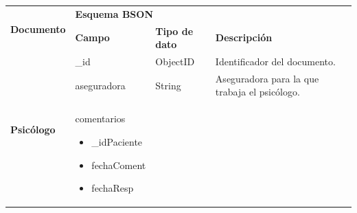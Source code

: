 \begin{table}[htpb]
\centering
\begin{tabularx}{\textwidth}{|l|X|X|X|X|}
\hline
\multirow{2}{*}{\textbf{Documento}}  & \multicolumn{3}{l|}{\textbf{Esquema BSON}}                                                                                                                                                                                                                                                                                                                                                                                                        \\ \cline{2-4} 
                                     & \textbf{Campo}                                                                                 & \textbf{Tipo de dato}                                              & \textbf{Descripción}                                                                                                                                                                                                                                                        \\ \hline
\multirow{7}{*}{\textbf{Psicólogo}} & \_id                                                                                           & ObjectID                                                           & Identificador del documento.                                                                                                                                                                                                                                                \\ \cline{2-4} 
                                     & aseguradora                                                                                    & String                                                             & Aseguradora para la que trabaja el psicólogo.                                                                                                                                                                                                                               \\ \cline{2-4} 
                                     & comentarios \begin{itemize}
                                     \item \_idPaciente
                                     \item fechaComent
                                     \item fechaResp

\end{itemize}
\end{tabularx}
\end{table}
